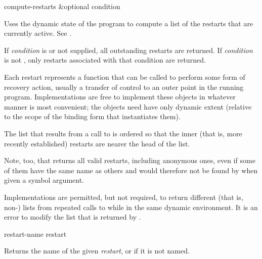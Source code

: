 \begin{defun}[Function]
compute-restarts &optional condition

  Uses the dynamic state of the program to compute a list of the restarts
  that are currently active. See .

If {\it condition} is  or not supplied, all outstanding restarts
are returned.
If {\it condition} is not , only restarts associated
with that condition are returned.

  Each restart represents a function that can be called to perform some
  form of recovery action, usually a transfer of control to an outer point
  in the running program. Implementations are free to implement these objects
  in whatever manner is most convenient; the objects need have only dynamic
  extent (relative to the scope of the binding form that instantiates them).

  The list that results from a call to  is ordered so that
  the inner (that is, more recently established) restarts are nearer the head
  of the list.

  Note, too, that  returns all valid restarts, including
  anonymous ones, even if some of them have the same name as others and
  would therefore not be found by  when given a symbol argument.

  Implementations are permitted, but not required, to return different 
  (that is, non-) lists from repeated calls to  while in
  the same dynamic environment. It is an error to modify the list that
  is returned by .
\end{defun}


\begin{defun}[Function]
restart-name restart

  Returns the name of the given {\it restart}, or  if it is not named.
\end{defun}

